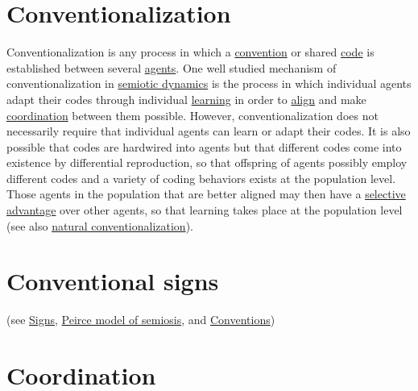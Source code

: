 \documentclass[12pt]{article}
\begin{document}
\hypertarget{conventionalization}{}
\section{Conventionalization}

Conventionalization is any process in which a
\hyperlink{convention}{convention} or shared \hyperlink{code}{code} is established
between several \hyperlink{agent}{agents}. One well studied mechanism of
conventionalization in \hyperlink{semiotic_dynamics}{semiotic
  dynamics} is the process in which individual agents adapt their
codes through individual \hyperlink{learning}{learning} in order to
\hyperlink{alignment}{align} and make
\hyperlink{coordination}{coordination} between them possible. However,
conventionalization does not necessarily require that individual
agents can learn or adapt their codes. It is also possible that codes
are hardwired into agents but that different codes come into existence
by differential reproduction, so that offspring of agents possibly
employ different codes and a variety of coding behaviors exists at the
population level. Those agents in the population that are better
aligned may then have a \hyperlink{selection}{selective advantage}
over other agents, so that learning takes place at the population
level (see also \hyperlink{natural_conventionalization}{natural
  conventionalization}).

\hypertarget{conventional_signs}{}
\section{Conventional signs} 

(see \hyperlink{signs}{Signs}, \hyperlink{peirce_model_of_semiosis}{Peirce model of semiosis}, and \hyperlink{convention}{Conventions})

\hypertarget{coordination}{}
\section{Coordination}
\end{document}
